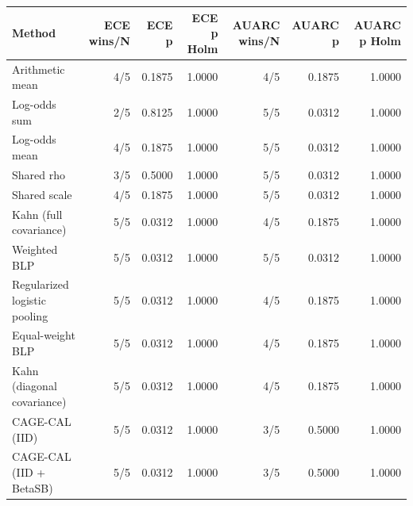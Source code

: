 \begin{tabular}{lrrrrrr}
\toprule
Method & ECE wins/N & ECE p & ECE p Holm & AUARC wins/N & AUARC p & AUARC p Holm \\
\midrule
Arithmetic mean & 4/5 & 0.1875 & 1.0000 & 4/5 & 0.1875 & 1.0000 \\
Log-odds sum & 2/5 & 0.8125 & 1.0000 & 5/5 & 0.0312 & 1.0000 \\
Log-odds mean & 4/5 & 0.1875 & 1.0000 & 5/5 & 0.0312 & 1.0000 \\
Shared rho & 3/5 & 0.5000 & 1.0000 & 5/5 & 0.0312 & 1.0000 \\
Shared scale & 4/5 & 0.1875 & 1.0000 & 5/5 & 0.0312 & 1.0000 \\
Kahn (full covariance) & 5/5 & 0.0312 & 1.0000 & 4/5 & 0.1875 & 1.0000 \\
Weighted BLP & 5/5 & 0.0312 & 1.0000 & 5/5 & 0.0312 & 1.0000 \\
Regularized logistic pooling & 5/5 & 0.0312 & 1.0000 & 4/5 & 0.1875 & 1.0000 \\
Equal-weight BLP & 5/5 & 0.0312 & 1.0000 & 4/5 & 0.1875 & 1.0000 \\
Kahn (diagonal covariance) & 5/5 & 0.0312 & 1.0000 & 4/5 & 0.1875 & 1.0000 \\
CAGE-CAL (IID) & 5/5 & 0.0312 & 1.0000 & 3/5 & 0.5000 & 1.0000 \\
CAGE-CAL (IID + BetaSB) & 5/5 & 0.0312 & 1.0000 & 3/5 & 0.5000 & 1.0000 \\
\bottomrule
\end{tabular}
